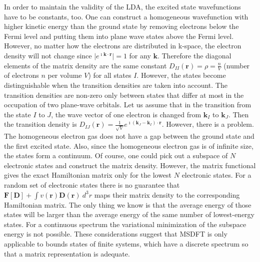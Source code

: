 \documentclass[journal=jpclcd,manuscript=letter]{achemso}
\newcommand\m[1]{\mathbf{#1}}
\renewcommand\vec[1]{\mathbf{#1}}
\begin{document}
In order to maintain the validity of the LDA, the excited state wavefunctions have to be constants, too.
One can construct a homogeneous wavefunction with higher kinetic energy than the ground state by removing electrons
below the Fermi level and putting them into plane wave states above the Fermi level. \cite{Hemanadhan2010}
However, no matter how the electrons are distributed in k-space, the electron density will not change
since $\vert e^{\imath \vec{k} \cdot \vec{r}} \vert = 1$ for any $\vec{\vec{k}}$.
Therefore the diagonal elements of the matrix density are the same constant $D_{II}(\vec{r}) = \rho = \frac{n}{V}$
(number of electrons $n$ per volume $V$) for all states $I$.
However, the states become distinguishable when the transition densities are taken into account.
The transition densities are non-zero only between states that differ at most in the occupation of two plane-wave orbitals.
Let us assume that in the transition from the state $I$ to $J$, the wave vector of one electron is changed from
$\vec{k}_I$ to $\vec{k}_J$. Then the transition density is
$D_{IJ}(\vec{r}) = \frac{1}{\sqrt{V}} e^{\imath (\vec{k}_J - \vec{k}_I) \cdot \vec{r}}$.
However, there is a problem. The homogeneous electron gas does not have a gap between the ground state and the first excited state.
Also, since the homogeneous electron gas is of infinite size, the states form a continuum. Of course, one could pick out a subspace of $N$
electronic states and construct the matrix density. 
However, the matrix functional gives the exact Hamiltonian matrix only for the lowest $N$ electronic states.
For a random set of electronic states there is no guarantee that $\m{F}[\m{D}] + \int v(\vec{r}) \m{D}(\vec{r}) ~ d^3\!r$
maps their matrix density to the corresponding Hamiltonian matrix.
The only thing we know is that the average energy of those states will be larger than the average energy
of the same number of lowest-energy states. For a continuous spectrum the variational minimization of the subspace energy is not possible.
These considerations suggest that MSDFT is only applicable to bounds states of finite systems, which have a discrete spectrum
so that a matrix representation is adequate.
\end{document}
